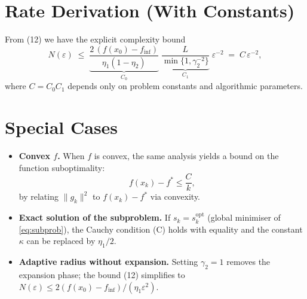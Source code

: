 \documentclass[11pt]{article}
\begin{document}
\section*{Rate Derivation (With Constants)}
From (12) we have the explicit complexity bound
\[
N(\varepsilon)\;\le\;
\underbrace{\frac{2\,(f(x_{0})-f_{\inf})}{\eta_{1}(1-\eta_{2})}}_{\displaystyle C_{0}}
\;
\underbrace{\frac{L}{\min\{1,\gamma_{2}^{-2}\}}}_{\displaystyle C_{1}}
\;\varepsilon^{-2}
\;=\;C\,\varepsilon^{-2},
\]
where $C=C_{0}C_{1}$ depends only on problem constants and algorithmic parameters.

\section*{Special Cases}
\begin{itemize}
\item \textbf{Convex $f$.}  When $f$ is convex, the same analysis yields a bound on the function suboptimality:
\[
f(x_{k})-f^{*}\le \frac{C}{k},
\]
by relating $\|g_{k}\|^{2}$ to $f(x_{k})-f^{*}$ via convexity.
\item \textbf{Exact solution of the subproblem.}  If $s_{k}=s_{k}^{\text{opt}}$ (global minimiser of \eqref{eq:subprob}), the Cauchy condition (C) holds with equality and the constant $\kappa$ can be replaced by $\eta_{1}/2$.
\item \textbf{Adaptive radius without expansion.}  Setting $\gamma_{2}=1$ removes the expansion phase; the bound (12) simplifies to $N(\varepsilon)\le 2(f(x_{0})-f_{\inf})/(\eta_{1}\varepsilon^{2})$.
\end{itemize}
\end{document}
